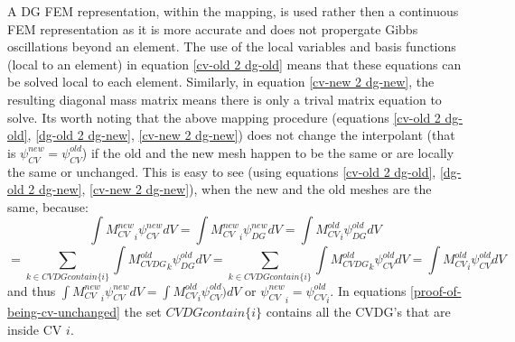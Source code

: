 A DG FEM representation, within the mapping, is used
rather then a continuous FEM representation as it is more accurate and does not
propergate Gibbs oscillations beyond an element. The use of the local variables and basis
functions (local to an element) in equation \ref{cv-old 2 dg-old} means that these equations can be solved local to each element.
Similarly, in equation \ref{cv-new 2 dg-new}, the resulting diagonal mass matrix means there is only a trival
matrix equation to solve.
Its worth noting that the above mapping procedure (equations \ref{cv-old 2 dg-old}, \ref{dg-old 2 dg-new}, \ref{cv-new 2 dg-new}) does not change the interpolant (that is $\psi_{CV}^{new} = \psi_{CV}^{old}$) if the
old and the new mesh happen to be the same or are locally the same or unchanged.
This is easy to see (using equations \ref{cv-old 2 dg-old}, \ref{dg-old 2 dg-new}, \ref{cv-new 2 dg-new}),
when the new and the old meshes are the same, because:
\begin{equation}
\int {M_{CV}^{new}}_i \psi_{CV}^{new} dV =
\int {M_{CV}^{new}}_i \psi_{DG}^{new} dV =
\int  {M_{CV}^{old}}_i \psi_{DG}^{old} dV
\end{equation}
\begin{equation}
=
\sum_{k\in CVDGcontain\{i\} } \int  {M_{CVDG}^{old}}_k \psi_{DG}^{old} dV =
\sum_{k\in CVDGcontain\{i\} } \int  {M_{CVDG}^{old}}_k \psi_{CV}^{old} dV =
\int  {M_{CV}^{old}}_i \psi_{CV}^{old}  dV
\label{proof-of-being-cv-unchanged}
\end{equation}
and thus $\int {M_{CV}^{new}}_i \psi_{CV}^{new} dV =\int  {M_{CV}^{old}}_i \psi_{CV}^{old} ) dV$
or ${\psi_{CV}^{new}}_i={\psi_{CV}^{old}}_i$.
In equations \ref{proof-of-being-cv-unchanged} the set $CVDGcontain\{i\}$ contains all the
CVDG's that are inside CV $i$.



